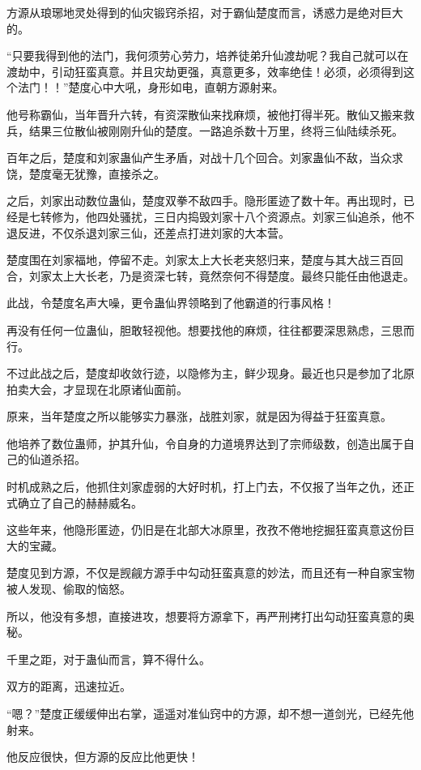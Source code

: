 \begin{this_body}
方源从琅琊地灵处得到的仙灾锻窍杀招，对于霸仙楚度而言，诱惑力是绝对巨大的。

“只要我得到他的法门，我何须劳心劳力，培养徒弟升仙渡劫呢？我自己就可以在渡劫中，引动狂蛮真意。并且灾劫更强，真意更多，效率绝佳！必须，必须得到这个法门！！”楚度心中大吼，身形如电，直朝方源射来。

他号称霸仙，当年晋升六转，有资深散仙来找麻烦，被他打得半死。散仙又搬来救兵，结果三位散仙被刚刚升仙的楚度。一路追杀数十万里，终将三仙陆续杀死。

百年之后，楚度和刘家蛊仙产生矛盾，对战十几个回合。刘家蛊仙不敌，当众求饶，楚度毫无犹豫，直接杀之。

之后，刘家出动数位蛊仙，楚度双拳不敌四手。隐形匿迹了数十年。再出现时，已经是七转修为，他四处骚扰，三日内捣毁刘家十八个资源点。刘家三仙追杀，他不退反进，不仅杀退刘家三仙，还差点打进刘家的大本营。

楚度围在刘家福地，停留不走。刘家太上大长老夹怒归来，楚度与其大战三百回合，刘家太上大长老，乃是资深七转，竟然奈何不得楚度。最终只能任由他退走。

此战，令楚度名声大噪，更令蛊仙界领略到了他霸道的行事风格！

再没有任何一位蛊仙，胆敢轻视他。想要找他的麻烦，往往都要深思熟虑，三思而行。

不过此战之后，楚度却收敛行迹，以隐修为主，鲜少现身。最近也只是参加了北原拍卖大会，才显现在北原诸仙面前。

原来，当年楚度之所以能够实力暴涨，战胜刘家，就是因为得益于狂蛮真意。

他培养了数位蛊师，护其升仙，令自身的力道境界达到了宗师级数，创造出属于自己的仙道杀招。

时机成熟之后，他抓住刘家虚弱的大好时机，打上门去，不仅报了当年之仇，还正式确立了自己的赫赫威名。

这些年来，他隐形匿迹，仍旧是在北部大冰原里，孜孜不倦地挖掘狂蛮真意这份巨大的宝藏。

楚度见到方源，不仅是觊觎方源手中勾动狂蛮真意的妙法，而且还有一种自家宝物被人发现、偷取的恼怒。

所以，他没有多想，直接进攻，想要将方源拿下，再严刑拷打出勾动狂蛮真意的奥秘。

千里之距，对于蛊仙而言，算不得什么。

双方的距离，迅速拉近。

“嗯？”楚度正缓缓伸出右掌，遥遥对准仙窍中的方源，却不想一道剑光，已经先他射来。

他反应很快，但方源的反应比他更快！


\end{this_body}

